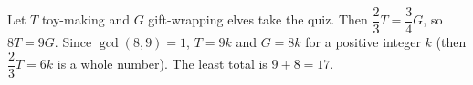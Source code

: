 Let $T$ toy-making and $G$ gift-wrapping elves take the quiz. Then $\dfrac{2}{3}T=\dfrac{3}{4}G$, so $8T=9G$. Since $\gcd(8,9)=1$, $T=9k$ and $G=8k$ for a positive integer $k$ (then $\dfrac{2}{3}T=6k$ is a whole number). The least total is $9+8=\boxed{17}$.

